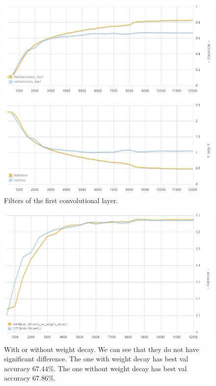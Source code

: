 \begin{figure}[ht]
\centering
    \includegraphics[width=0.9\linewidth]{fig/curve1}
    \caption{\small
    Filters of the first convolutional layer.}
    \label{fig:2}
\end{figure}

\begin{figure}[ht]
\centering
    \includegraphics[width=0.9\linewidth]{fig/nodecayacc}
    \caption{\small
    With or without weight decay.
    We can see that they do not have significant difference.
    The one with weight decay has best val accuracy $67.44\%$.
    The one without weight decay has best val accuracy $67.86\%$.}
    \label{fig:3}
\end{figure}


\subsection{} %

